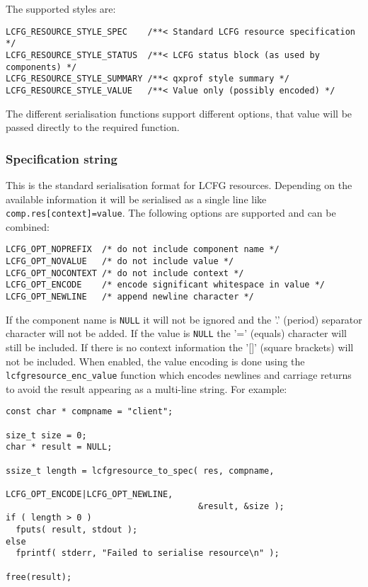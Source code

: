 \documentclass[11pt,a4paper,titlepage]{article}
\begin{document}
The supported styles are:

\begin{verbatim}
LCFG_RESOURCE_STYLE_SPEC    /**< Standard LCFG resource specification */
LCFG_RESOURCE_STYLE_STATUS  /**< LCFG status block (as used by components) */
LCFG_RESOURCE_STYLE_SUMMARY /**< qxprof style summary */
LCFG_RESOURCE_STYLE_VALUE   /**< Value only (possibly encoded) */
\end{verbatim}

The different serialisation functions support different options, that
value will be passed directly to the required function.

\subsubsection{Specification string}

This is the standard serialisation format for LCFG
resources. Depending on the available information it will be
serialised as a single line like \texttt{comp.res[context]=value}. The
following options are supported and can be combined:

\begin{verbatim}
LCFG_OPT_NOPREFIX  /* do not include component name */
LCFG_OPT_NOVALUE   /* do not include value */
LCFG_OPT_NOCONTEXT /* do not include context */
LCFG_OPT_ENCODE    /* encode significant whitespace in value */
LCFG_OPT_NEWLINE   /* append newline character */
\end{verbatim}

If the component name is \texttt{NULL} it will not be ignored and the
'.'  (period) separator character will not be added. If the value is
\texttt{NULL} the '=' (equals) character will still be included. If
there is no context information the '[]' (square brackets) will not be
included. When enabled, the value encoding is done using the
\texttt{lcfgresource\_enc\_value} function which encodes newlines and
carriage returns to avoid the result appearing as a multi-line
string. For example:

\begin{verbatim}
const char * compname = "client";

size_t size = 0;
char * result = NULL;

ssize_t length = lcfgresource_to_spec( res, compname,
                                      LCFG_OPT_ENCODE|LCFG_OPT_NEWLINE,
                                      &result, &size );
if ( length > 0 )
  fputs( result, stdout );
else
  fprintf( stderr, "Failed to serialise resource\n" );

free(result);
\end{verbatim}
\end{document}
